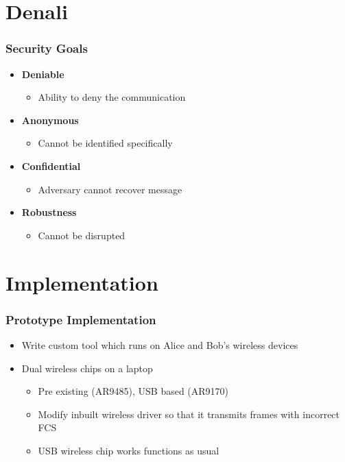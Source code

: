\documentclass{beamer}
\begin{document}
\section{Denali}
\begin{frame}
  \frametitle{Security Goals}
    \begin{itemize}
    \item \textbf{Deniable}
      \begin{itemize}
      \item Ability to deny the communication
      \end{itemize}
    \item \textbf{Anonymous}
      \begin{itemize}
      \item Cannot be identified specifically
      \end{itemize}
    \item \textbf{Confidential}
      \begin{itemize}
      \item Adversary cannot recover message
      \end{itemize}
    \item \textbf{Robustness}
      \begin{itemize}
    \item  Cannot be disrupted
      \end{itemize}      
    \end{itemize}
\end{frame}

\section{Implementation}
\begin{frame}
  \frametitle{Prototype Implementation}
    \begin{itemize}
    \item Write custom tool which runs on Alice and Bob's wireless devices
    \item Dual wireless chips on a laptop
      \begin{itemize}
      \item Pre existing (AR9485), USB based (AR9170)
      \item Modify inbuilt wireless driver so that it transmits
        frames with incorrect FCS
      \item USB wireless chip works functions as usual
      \end{itemize}
    \end{itemize}
\end{frame}
\end{document}

